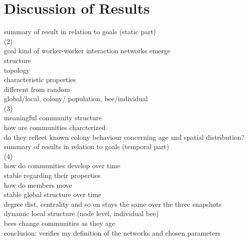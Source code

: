\section{Discussion of Results}

summary of result in relation to goals (static part)\\
(2)\\
goal kind of worker-worker interaction networks emerge\\
structure\\
topology\\
characteristic properties\\
different from random\\
global/local, colony/ population, bee/individual\\

(3)\\
meaningful community structure\\
how are communities charcterized\\
do they reflect known colony behaviour concerning age and spatial distribution?\\

summary of results in relation to goals (temporal part)\\
(4)\\
how do communities develop over time\\
stable regarding their properties\\
how do members move\\




stable global structure over time\\
degree dist, centrality and so on stays the same over the three snapshots\\
dynamic local structure (node level, individual bee)\\
bees change communities as they age\\
conclusion: verifies my definition of the networks and chosen parameters\\